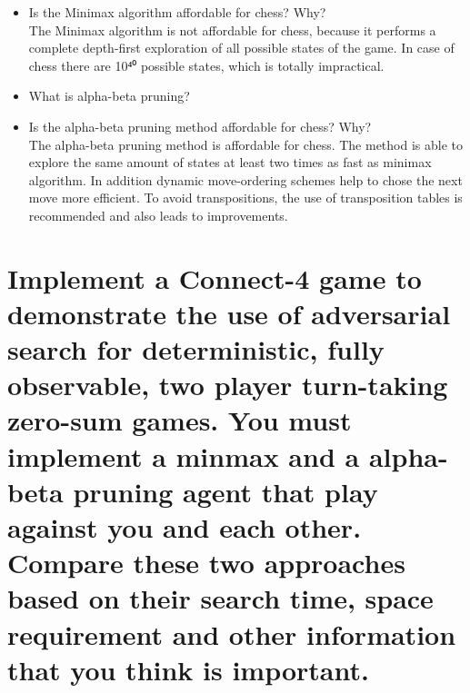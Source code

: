\documentclass[11pt]{article}
\begin{document}
\begin{itemize}
	\item Is the Minimax algorithm affordable for chess? Why?\\
	The Minimax algorithm is not affordable for chess, because it performs a complete depth-first exploration of all possible states of the game. In case of chess there are 10⁴⁰ possible states, which is totally impractical.
	
	\item What is alpha-beta pruning?\\
	
	\item Is the alpha-beta pruning method affordable for chess? Why?\\
	The alpha-beta pruning method is affordable for chess. The method is able to explore the same amount of states at least two times as fast as minimax algorithm. In addition dynamic move-ordering schemes help to chose the next move more efficient. To avoid transpositions, the use of transposition tables is recommended and also leads to improvements. 
	
\end{itemize}


\section{Implement a Connect-4 game to demonstrate the use of adversarial search for deterministic, fully observable, two player turn-taking zero-sum games. You must implement a minmax and a alpha-beta pruning agent that play against you and each other. Compare these two approaches based on their search time, space requirement and other information that you think is important.}
\end{document}
